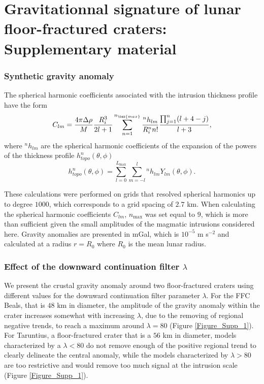 \chapter{Gravitationnal  signature of  lunar floor-fractured  craters:
  Supplementary material}
\label{chap:A5}

\subsection{Synthetic gravity anomaly}

The  spherical harmonic  coefficients  associated  with the  intrusion
thickness profile have the form
\begin{equation}
  C_{lm}=\frac{4\pi \Delta \rho}{M}\frac{R_i^3}{2l +1}\sum^{n_{\tex{max}}}_{n=1}\frac{^nh_{lm}}{R_i^n n!}\frac{\prod^n_{j=1}(l+4-j)}{l+3},
\end{equation}
where  $^nh_{lm}$  are  the  spherical harmonic  coefficients  of  the
expansion    of    the    powers     of    the    thickness    profile
$h_{topo}^n(\theta,\phi)$
\begin{equation}
  h^n_{topo}(\theta,\phi)= \sum_{l=0}^{L_{\text{max}}}\sum_{m=-l}^{l}{^n}h_{lm}Y_{lm}(\theta,\phi).
\end{equation}

These  calculations were  performed on  grids that  resolved spherical
harmonics up to degree $1000$, which  corresponds to a grid spacing of
$2.7$  km.   When  calculating  the  spherical  harmonic  coefficients
$C_{lm}$, $n_{\text{max}}$  was set equal  to $9$, which is  more than
sufficient  given  the small  amplitudes  of  the magmatic  intrusions
considered here.  Gravity anomalies  are presented  in mGal,  which is
$10^{-5}$ m s$^{-2}$ and calculated at a radius $r=R_0$ where $R_0$ is
the mean lunar radius.

\subsection{Effect of the downward continuation filter $\lambda$}
  
We  present the  crustal  gravity anomaly  around two  floor-fractured
craters using  different values  for the downward  continuation filter
parameter $\lambda$.  For the FFC Beals,  that is $48$ km in diameter,
the  amplitude of  the  gravity anomaly  within  the crater  increases
somewhat with  increasing $\lambda$, due  to the removing  of regional
negative  trends, to  reach a  maximum around  $\lambda =  80$ (Figure
\ref{Figure_Supp_1}). For Taruntius, a  floor-fractured crater that is
a $56$ km  in diameter, models characterized by a  $\lambda<80$ do not
remove enough of the positive  regional trend to clearly delineate the
central anomaly,  while the  models characterized by  $\lambda>80$ are
too  restrictive and  would remove  too much  signal at  the intrusion
scale (Figure \ref{Figure_Supp_1}).

